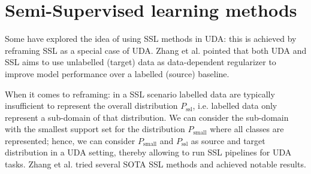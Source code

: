 \section{Semi-Supervised learning methods}
Some have explored the idea of using SSL methods in UDA: this is achieved by reframing SSL as a special case of UDA. Zhang et al.\cite{Zhang2021} pointed that both UDA and SSL aims to use unlabelled (target) data as data-dependent regularizer to improve model performance over a labelled (source) baseline. 

When it comes to reframing: in a SSL scenario labelled data are typically insufficient to represent the overall distribution \(P_{\textrm{ssl}}\), i.e. labelled data only represent a sub-domain of that distribution. We can consider the sub-domain with the smallest support set for the distribution \(P_{\textrm{small}}\) where all classes are represented; hence, we can consider \(P_{\textrm{small}}\) and \(P_{\textrm{ssl}}\) as source and target distribution in a UDA setting, thereby allowing to run SSL pipelines for UDA tasks. Zhang et al.\cite{Zhang2021} tried several SOTA SSL methods and achieved notable results.